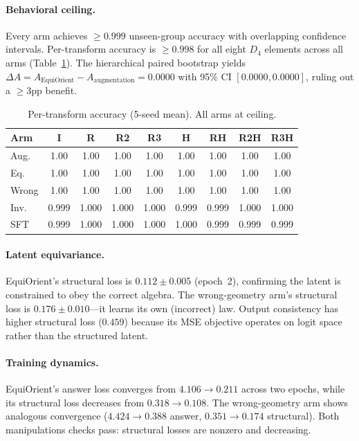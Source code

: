 \documentclass[10pt,twocolumn,letterpaper]{article}
\begin{document}
\paragraph{Behavioral ceiling.}
Every arm achieves $\geq 0.999$ unseen-group accuracy with overlapping
confidence intervals. Per-transform accuracy is $\geq 0.998$ for all
eight $D_4$ elements across all arms (Table~\ref{tab:per_transform}).
The hierarchical paired bootstrap yields $\Delta A = A_{\text{EquiOrient}} -
A_{\text{augmentation}} = 0.0000$ with 95\% CI $[0.0000, 0.0000]$,
ruling out a $\geq 3$pp benefit.

\begin{table}[t]
\centering\small
\begin{tabular}{lcccccccc}
\toprule
Arm & I & R & R2 & R3 & H & RH & R2H & R3H \\
\midrule
Aug. & 1.00 & 1.00 & 1.00 & 1.00 & 1.00 & 1.00 & 1.00 & 1.00 \\
Eq. & 1.00 & 1.00 & 1.00 & 1.00 & 1.00 & 1.00 & 1.00 & 1.00 \\
Wrong & 1.00 & 1.00 & 1.00 & 1.00 & 1.00 & 1.00 & 1.00 & 1.00 \\
Inv. & 0.999 & 1.000 & 1.000 & 1.000 & 0.999 & 0.999 & 1.000 & 1.000 \\
SFT & 0.999 & 1.000 & 1.000 & 1.000 & 1.000 & 0.999 & 0.999 & 0.999 \\
\bottomrule
\end{tabular}
\caption{Per-transform accuracy (5-seed mean). All arms at ceiling.}
\label{tab:per_transform}
\end{table}

\paragraph{Latent equivariance.}
EquiOrient's structural loss is $0.112 \pm 0.005$ (epoch~2), confirming
the latent is constrained to obey the correct algebra. The
wrong-geometry arm's structural loss is $0.176 \pm 0.010$---it learns
its own (incorrect) law. Output consistency has higher structural loss
($0.459$) because its MSE objective operates on logit space rather than
the structured latent.

\paragraph{Training dynamics.}
EquiOrient's answer loss converges from $4.106 \to 0.211$ across two
epochs, while its structural loss decreases from $0.318 \to 0.108$.
The wrong-geometry arm shows analogous convergence ($4.424 \to 0.388$
answer, $0.351 \to 0.174$ structural). Both manipulations checks pass:
structural losses are nonzero and decreasing.
\end{document}
